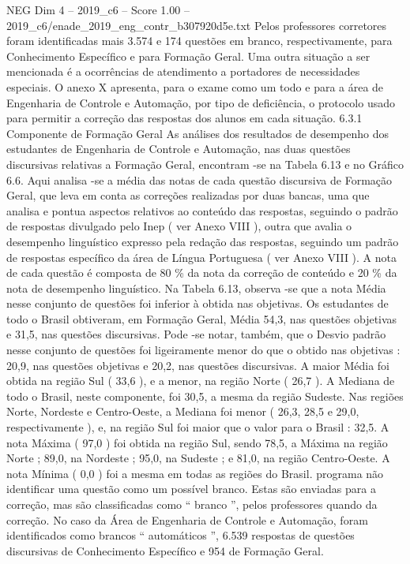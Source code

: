 \begin{textsample}{NEG Dim 4 – 2019\_c6 – Score 1.00 – 2019\_c6/enade\_2019\_eng\_contr\_b307920d5e.txt}
Pelos professores corretores foram identificadas mais 3.574 e 174 questões em branco, respectivamente, para Conhecimento Específico e para Formação Geral.
Uma outra situação a ser mencionada é a ocorrências de atendimento a portadores de necessidades especiais.
O anexo X apresenta, para o exame como um todo e para a área de Engenharia de Controle e Automação, por tipo de deficiência, o protocolo usado para permitir a correção das respostas dos alunos em cada situação. 6.3.1 Componente de Formação Geral As análises dos resultados de desempenho dos estudantes de Engenharia de Controle e Automação, nas duas questões discursivas relativas a Formação Geral, encontram -se na Tabela 6.13 e no Gráfico 6.6.
Aqui analisa -se a média das notas de cada questão discursiva de Formação Geral, que leva em conta as correções realizadas por duas bancas, uma que analisa e pontua aspectos relativos ao conteúdo das respostas, seguindo o padrão de respostas divulgado pelo Inep ( ver Anexo VIII ), outra que avalia o desempenho linguístico expresso pela redação das respostas, seguindo um padrão de respostas específico da área de Língua Portuguesa ( ver Anexo VIII ).
A nota de cada questão é composta de 80 \% da nota da correção de conteúdo e 20 \% da nota de desempenho linguístico.
Na Tabela 6.13, observa -se que a nota Média nesse conjunto de questões foi inferior à obtida nas objetivas.
Os estudantes de todo o Brasil obtiveram, em Formação Geral, Média 54,3, nas questões objetivas e 31,5, nas questões discursivas.
Pode -se notar, também, que o Desvio padrão nesse conjunto de questões foi ligeiramente menor do que o obtido nas objetivas : 20,9, nas questões objetivas e 20,2, nas questões discursivas.
A maior Média foi obtida na região Sul ( 33,6 ), e a menor, na região Norte ( 26,7 ).
A Mediana de todo o Brasil, neste componente, foi 30,5, a mesma da região Sudeste.
Nas regiões Norte, Nordeste e Centro-Oeste, a Mediana foi menor ( 26,3, 28,5 e 29,0, respectivamente ), e, na região Sul foi maior que o valor para o Brasil : 32,5.
A nota Máxima ( 97,0 ) foi obtida na região Sul, sendo 78,5, a Máxima na região Norte ; 89,0, na Nordeste ; 95,0, na Sudeste ; e 81,0, na região Centro-Oeste.
A nota Mínima ( 0,0 ) foi a mesma em todas as regiões do Brasil. programa não identificar uma questão como um possível branco.
Estas são enviadas para a correção, mas são classificadas como “ branco ”, pelos professores quando da correção.
No caso da Área de Engenharia de Controle e Automação, foram identificados como brancos “ automáticos ”, 6.539 respostas de questões discursivas de Conhecimento Específico e 954 de Formação Geral.

\end{textsample}
